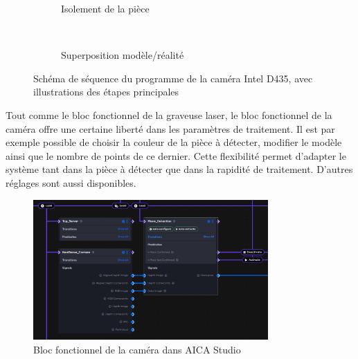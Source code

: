 \begin{figure}[H]
\begin{minipage}{0.4\textwidth}
\begin{subfigure}{0.8\linewidth}
            \caption{Isolement de la pièce}
        \end{subfigure}\\[0.2cm]
        \begin{subfigure}{0.8\linewidth}
            \caption{Superposition modèle/réalité}
        \end{subfigure}
    \end{minipage}
    \caption{Schéma de séquence du programme de la caméra Intel D435, avec illustrations des étapes principales}
    \label{fig:sequence_camera_illustre}
\end{figure}

Tout comme le bloc fonctionnel de la graveuse laser, le bloc fonctionnel de la caméra offre une certaine liberté dans les paramètres de traitement. Il est par exemple possible de choisir la couleur de la pièce à détecter, modifier le modèle ainsi que le nombre de points de ce dernier. Cette flexibilité permet d'adapter le système tant dans la pièce à détecter que dans la rapidité de traitement. D'autres réglages sont aussi disponibles.

\begin{figure}[H]
    \centering
    \includegraphics[width=0.8\textwidth]{assets/figures/AICA_Camera.png}
    \caption{Bloc fonctionnel de la caméra dans AICA Studio}
    \label{fig:camera_interface}
\end{figure}

